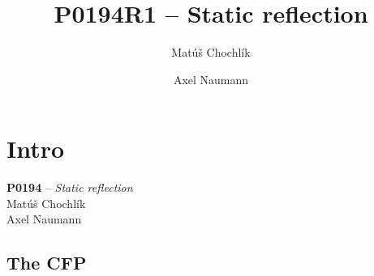 \documentclass[compress,table,xcolor=table]{beamer}
\author[Chochl\'{i}k M. -- Naumann A.]{Mat\'{u}\v{s} Chochl\'{i}k \and Axel Naumann}
\begin{document}
\title{P0194R1 -- Static reflection}

\section{Intro}

\begin{frame}
\begin{center}
  \Huge
  \textbf{P0194} -- {\em Static reflection}\\
  \normalsize
  \vspace{3em}
  Mat\'{u}\v{s} Chochl\'{i}k\\
  Axel Naumann
\end{center}
\end{frame}

\subsection{The CFP}
\end{document}
